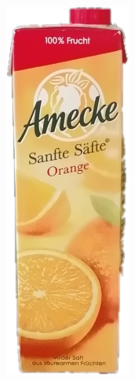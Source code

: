 \documentclass[a4paper,12pt,oneside]{article}
\begin{document}
\begin{figure}[htb]
\begin{minipage}[c]{0.08\textwidth}
\includegraphics[width=\textwidth]{Sources/Bild2_HA.png}

\end{minipage}
\end{figure}
\end{document}
